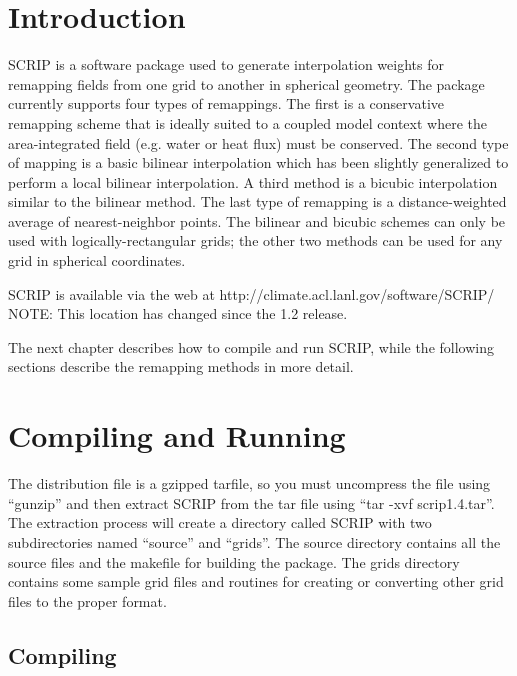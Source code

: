 \documentclass[12pt]{report}
\begin{document}
\tableofcontents

\chapter{Introduction}

SCRIP is a software package used to generate interpolation weights
for remapping fields from one grid to another in spherical geometry.
The package currently supports four types of remappings.  The
first is a conservative remapping scheme that
is ideally suited to a coupled model context where the area-integrated
field (e.g. water or heat flux) must be conserved.  The second
type of mapping is a basic bilinear interpolation which has
been slightly generalized to perform a local bilinear interpolation.
A third method is a bicubic interpolation similar to the
bilinear method.
The last type of remapping is a distance-weighted average of
nearest-neighbor points.  The bilinear and bicubic schemes can
only be used with logically-rectangular grids; the other two methods
can be used for any grid in spherical coordinates.

SCRIP is available via the web at \newline
http://climate.acl.lanl.gov/software/SCRIP/ \newline
NOTE: This location has changed since the 1.2 release.

The next chapter describes how to compile and run SCRIP, while
the following sections describe the remapping methods in more
detail.

\chapter{Compiling and Running}

The distribution file is a gzipped tarfile, so you must
uncompress the file using ``gunzip'' and then extract SCRIP
from the tar file using ``tar -xvf scrip1.4.tar''.  The extraction
process will create a directory called SCRIP with two
subdirectories named ``source'' and ``grids''.  The source
directory contains all the source files and the makefile
for building the package.  The grids directory contains
some sample grid files and routines for creating or
converting other grid files to the proper format.

\section{Compiling}
\end{document}
